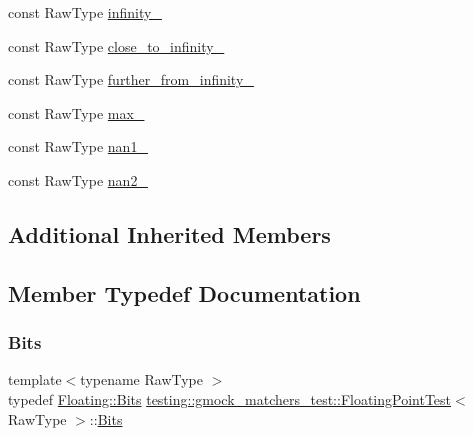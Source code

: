 \begin{DoxyCompactItemize}
const Raw\+Type \mbox{\hyperlink{classtesting_1_1gmock__matchers__test_1_1FloatingPointTest_a21d8a019a6365ddff80e301a6163f43f}{infinity\+\_\+}}
\item 
const Raw\+Type \mbox{\hyperlink{classtesting_1_1gmock__matchers__test_1_1FloatingPointTest_a6fc8ac2030f4883e1c84da3a21bbb7c3}{close\+\_\+to\+\_\+infinity\+\_\+}}
\item 
const Raw\+Type \mbox{\hyperlink{classtesting_1_1gmock__matchers__test_1_1FloatingPointTest_a603ab51280ecb1c4147c2660a7a90728}{further\+\_\+from\+\_\+infinity\+\_\+}}
\item 
const Raw\+Type \mbox{\hyperlink{classtesting_1_1gmock__matchers__test_1_1FloatingPointTest_a17b9dd56136b64fa7210bfe024d88c30}{max\+\_\+}}
\item 
const Raw\+Type \mbox{\hyperlink{classtesting_1_1gmock__matchers__test_1_1FloatingPointTest_a0d2544956414eac21d4519fe600e4603}{nan1\+\_\+}}
\item 
const Raw\+Type \mbox{\hyperlink{classtesting_1_1gmock__matchers__test_1_1FloatingPointTest_a4af3b3e53a06d271479ff30f5d5ee155}{nan2\+\_\+}}
\end{DoxyCompactItemize}
\subsection*{Additional Inherited Members}


\subsection{Member Typedef Documentation}
\mbox{\label{classtesting_1_1gmock__matchers__test_1_1FloatingPointTest_addf899bd832ae51103198d201d2f2ea2}} 
\subsubsection{\texorpdfstring{Bits}{Bits}}
{\footnotesize\ttfamily template$<$typename Raw\+Type $>$ \\
typedef \mbox{\hyperlink{classtesting_1_1internal_1_1FloatingPoint_abf228bf6cd48f12c8b44c85b4971a731}{Floating\+::\+Bits}} \mbox{\hyperlink{classtesting_1_1gmock__matchers__test_1_1FloatingPointTest}{testing\+::gmock\+\_\+matchers\+\_\+test\+::\+Floating\+Point\+Test}}$<$ Raw\+Type $>$\+::\mbox{\hyperlink{classtesting_1_1gmock__matchers__test_1_1FloatingPointTest_addf899bd832ae51103198d201d2f2ea2}{Bits}}\hspace{0.3cm}{\ttfamily [protected]}}

